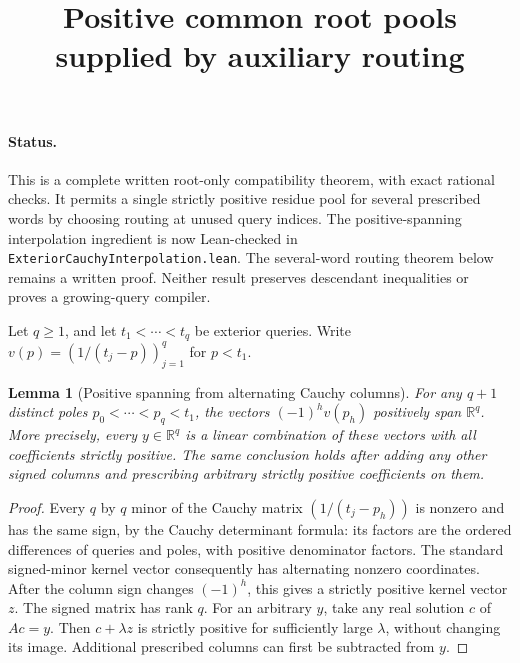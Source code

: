 \documentclass[11pt]{article}
\title{Positive common root pools supplied by auxiliary routing}
\author{}\date{}
\newtheorem{lemma}{Lemma}
\begin{document}
\maketitle

\paragraph{Status.}
This is a complete written root-only compatibility theorem, with exact
rational checks. It permits a single strictly positive residue pool for
several prescribed words by choosing routing at unused query indices.
The positive-spanning interpolation ingredient is now Lean-checked in
\texttt{ExteriorCauchyInterpolation.lean}. The several-word routing
theorem below remains a written proof. Neither result preserves
descendant inequalities or proves a growing-query compiler.

Let $q\geq1$, and let $t_1<\cdots<t_q$ be exterior queries. Write
$v(p)=(1/(t_j-p))_{j=1}^q$ for $p<t_1$.

\begin{lemma}[Positive spanning from alternating Cauchy columns]
For any $q+1$ distinct poles $p_0<\cdots<p_q<t_1$, the vectors
$(-1)^h v(p_h)$ positively span $\mathbb R^q$. More precisely,
every $y\in\mathbb R^q$ is a linear combination of these vectors
with all coefficients strictly positive.
The same conclusion holds after adding any other signed columns
and prescribing arbitrary strictly positive coefficients on them.
\end{lemma}
\begin{proof}
Every $q$ by $q$ minor of the Cauchy matrix $(1/(t_j-p_h))$ is
nonzero and has the same sign, by the Cauchy determinant formula:
its factors are the ordered differences of queries and poles,
with positive denominator factors. The standard signed-minor
kernel vector consequently has alternating nonzero coordinates.
After the column sign changes $(-1)^h$, this gives a strictly
positive kernel vector $z$. The signed matrix has rank $q$.
For an arbitrary $y$, take any real solution $c$ of $Ac=y$.
Then $c+\lambda z$ is strictly positive for sufficiently large
$\lambda$, without changing its image. Additional prescribed
columns can first be subtracted from $y$.
\end{proof}
\end{document}
